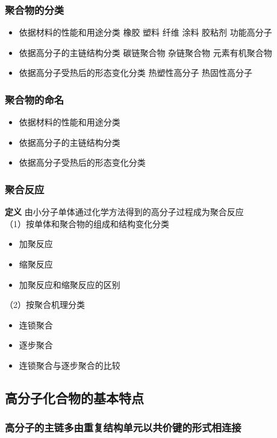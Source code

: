 ﻿\documentclass[12pt,a4paper]{article}
\begin{document}
\subsubsection{聚合物的分类}
\begin{itemize}
\item 依据材料的性能和用途分类
\subitem 橡胶
\subitem 塑料
\subitem 纤维
\subitem 涂料
\subitem 胶粘剂
\subitem 功能高分子
\item 依据高分子的主链结构分类
\subitem 碳链聚合物
\subitem 杂链聚合物
\subitem 元素有机聚合物
\item 依据高分子受热后的形态变化分类
\subitem 热塑性高分子
\subitem 热固性高分子
\end{itemize}
\subsubsection{聚合物的命名}

\begin{itemize}
\item 依据材料的性能和用途分类
\item 依据高分子的主链结构分类
\item 依据高分子受热后的形态变化分类
\end{itemize}
\subsubsection{聚合反应}
{\bf 定义} 由小分子单体通过化学方法得到的高分子过程成为聚合反应
\\
（1）按单体和聚合物的组成和结构变化分类
\begin{itemize}
\item {加聚反应}
\item {缩聚反应}
\item 加聚反应和缩聚反应的区别
\end{itemize}
（2）按聚合机理分类
\begin{itemize}
\item {连锁聚合}
\item {逐步聚合}
\item {连锁聚合与逐步聚合的比较}
\end{itemize}
\subsection{高分子化合物的基本特点}
\subsubsection{高分子的主链多由重复结构单元以共价键的形式相连接}
\end{document}
